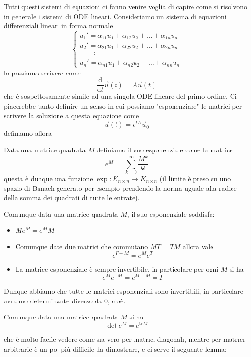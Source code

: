 \documentclass[11pt]{scrartcl}
\newcommand{\dif}{\text{d}}
\begin{document}
	Tutti questi sistemi di equazioni ci fanno venire voglia di capire come si risolvono in generale i sistemi di ODE lineari. Consideriamo un sistema di equazioni differenziali lineari in forma normale
	$$
	\begin{cases}
		u_1'=\alpha_{11}u_1+\alpha_{12}u_2+\dots +\alpha_{1n}u_n \\
		u_2'=\alpha_{21}u_1+\alpha_{22}u_2+\dots +\alpha_{2n}u_n \\
		\qquad \vdots \\
		u_n'=\alpha_{n1}u_1+\alpha_{n2}u_2+\dots +\alpha_{nn}u_n
	\end{cases}
	$$
	lo possiamo scrivere come
	$$\frac{\dif}{\dif t}\vec{u}(t)=A\vec{u}(t)$$
	che è sospettosamente simile ad una singola ODE lineare del primo ordine. Ci piacerebbe tanto definire un senso in cui possiamo "esponenziare" le matrici per scrivere la soluzione a questa equazione come
	$$\vec{u}(t)=e^{tA}\vec{u}_0$$
	definiamo allora
	\begin{definition}
		Data una matrice quadrata $M$ definiamo il suo esponenziale come la matrice 
		$$e^M:=\sum_{k=0}^{\infty}\frac{M^k}{k!}$$
		questa è dunque una funzione $\exp:K_{n\times n}\to K_{n\times n}$ (il limite è preso su uno spazio di Banach generato per esempio prendendo la norma uguale alla radice della somma dei quadrati di tutte le entrate).
	\end{definition}
	\begin{proposition}
		Comunque data una matrice quadrata $M$, il suo esponenziale soddisfa:
		\begin{itemize}
			\item $Me^M=e^MM$
			\item Comunque date due matrici che commutano $MT=TM$ allora vale
			$$e^{T+M}=e^Me^T$$
			\item La matrice esponenziale è sempre invertibile, in particolare per ogni $M$ si ha
			$$e^Me^{-M}=e^{M-M}=I$$
		\end{itemize}
	\end{proposition}
	Dunque abbiamo che tutte le matrici esponenziali sono invertibili, in particolare avranno determinante diverso da $0$, cioè:
	\begin{proposition}
		Comunque data una matrice quadrata $M$ si ha
		$$\det e^M=e^{\text{tr}M}$$
	\end{proposition}
	che è molto facile vedere come sia vero per matrici diagonali, mentre per matrici arbitrarie è un po' più difficile da dimostrare, e ci serve il seguente lemma:
\end{document}
